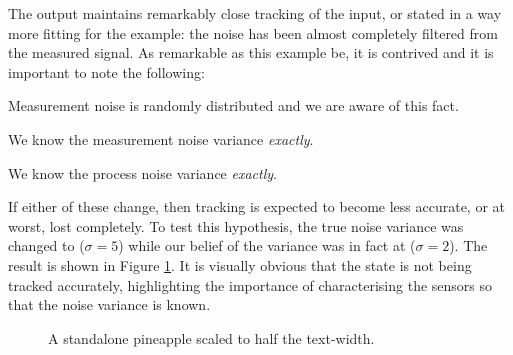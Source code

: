 The output maintains remarkably close tracking of the input, or stated in a
way more fitting for the example: the noise has been almost completely filtered
from the measured signal. As remarkable as this example be, it is contrived and
it is important to note the following:
\begin{compactitem}
\item Measurement noise is randomly distributed and we are aware of this fact.
\item We know the measurement noise variance \emph{exactly}.
\item We know the process noise variance \emph{exactly}.
\end{compactitem}
If either of these change, then tracking is expected to become less accurate, or
at worst, lost completely. To test this hypothesis, the true noise variance was
changed to ($\sigma = 5$) while our belief of the variance was in fact at
($\sigma = 2$). The result is shown in Figure \ref{fig:filter-bad}. It is
visually obvious that the state is not being tracked accurately, highlighting
the importance of characterising the sensors so that the noise variance is
known.

\begin{figure}[h]
\centering
{}
\caption{A standalone pineapple scaled to half the text-width.}
\label{fig:filter-bad}
\end{figure}

